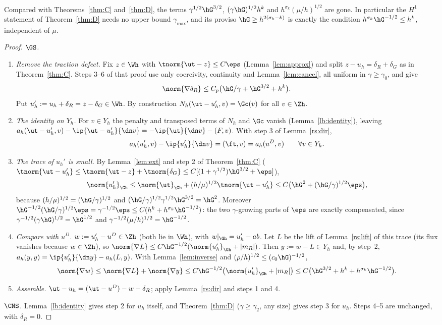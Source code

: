 Compared with Theorems~\ref{thm:C} and~\ref{thm:D}, the terms $\gamma^{1/2}\hG^{3/2}$, $(\gamma\hG)^{1/2}h^k$ and $h^{\sigma_k}(\mu/h)^{1/2}$ are gone. In particular the $H^1$ statement of Theorem~\ref{thm:D} needs no upper bound $\gamma_{\max}$, and its proviso $\hG\ge h^{2(\sigma_k-k)}$ is exactly the condition $h^{\sigma_k}\hG^{-1/2}\le h^k$, independent of $\mu$.

\begin{proof}
\emph{$\GS$.}
\begin{enumerate}
\item \emph{Remove the traction defect.} Fix $z\in\Wh$ with $\tnorm{\ut-z}\le C\eps$ (Lemma~\ref{lem:approx}) and split $z-u_h=\delta_R+\delta_G$ as in Theorem~\ref{thm:C}. Steps 3--6 of that proof use only coercivity, continuity and Lemma~\ref{lem:cancel}, all uniform in $\gamma\ge\gamma_0$, and give
\[
\norm{\nabla\delta_R}\le C_p\bigl(\hG/\gamma+\hG^{3/2}+h^k\bigr).
\]
Put $u_h':=u_h+\delta_R=z-\delta_G\in\Wh$. By construction $N_h(\ut-u_h',v)=\Gc(v)$ for all $v\in\Zh$.
\item \emph{The identity on $Y_h$.} For $v\in Y_h$ the penalty and transposed terms of $N_h$ and $\Gc$ vanish (Lemma~\ref{lb:identity}), leaving $a_h(\ut-u_h',v)-\ip{\ut-u_h'}{\dn v}=-\ip{\ut}{\dn v}-(F,v)$. With step 3 of Lemma~\ref{rs:dir},
\[
a_h(u_h',v)-\ip{u_h'}{\dn v}=(\ft,v)=a_h(u^D,v)\qquad\forall v\in Y_h .
\]
\item \emph{The trace of $u_h'$ is small.} By Lemma~\ref{lem:ext} and step 2 of Theorem~\ref{thm:C} ($\tnorm{\ut-u_h'}\le\tnorm{\ut-z}+\tnorm{\delta_G}\le C[(1+\gamma^{1/2})\hG^{3/2}+\eps]$),
\[
\norm{u_h'}_{\Gh}\le\norm{\ut}_{\Gh}+(h/\mu)^{1/2}\tnorm{\ut-u_h'}\le C\bigl(\hG^2+(\hG/\gamma)^{1/2}\eps\bigr),
\]
because $(h/\mu)^{1/2}=(\hG/\gamma)^{1/2}$ and $(\hG/\gamma)^{1/2}\gamma^{1/2}\hG^{3/2}=\hG^2$. Moreover $\hG^{-1/2}(\hG/\gamma)^{1/2}\eps=\gamma^{-1/2}\eps\le C(h^k+h^{\sigma_k}\hG^{-1/2})$: the two $\gamma$-growing parts of $\eps$ are exactly compensated, since $\gamma^{-1/2}(\gamma\hG)^{1/2}=\hG^{1/2}$ and $\gamma^{-1/2}(\mu/h)^{1/2}=\hG^{-1/2}$.
\item \emph{Compare with $u^D$.} $w:=u_h'-u^D\in\Zh$ (both lie in $\Wh$), with $w|_{\Gh}=u_h'-ab$. Let $L$ be the lift of Lemma~\ref{rs:lift} of this trace (its flux vanishes because $w\in\Zh$), so $\norm{\nabla L}\le C\hG^{-1/2}(\norm{u_h'}_{\Gh}+|m_R|)$. Then $y:=w-L\in Y_h$ and, by step~2, $a_h(y,y)=\ip{u_h'}{\dn y}-a_h(L,y)$. With Lemma~\ref{lem:inverse} and $(\rho/h)^{1/2}\le(c_0\hG)^{-1/2}$,
\[
\norm{\nabla w}\le\norm{\nabla L}+\norm{\nabla y}\le C\hG^{-1/2}\bigl(\norm{u_h'}_{\Gh}+|m_R|\bigr)\le C\bigl(\hG^{3/2}+h^k+h^{\sigma_k}\hG^{-1/2}\bigr).
\]
\item \emph{Assemble.} $\ut-u_h=(\ut-u^D)-w-\delta_R$; apply Lemma~\ref{rs:dir} and steps 1 and 4.
\end{enumerate}
\emph{$\CNS$.} Lemma~\ref{lb:identity} gives step 2 for $u_h$ itself, and Theorem~\ref{thm:D} ($\gamma\ge\gamma_2$, any size) gives step 3 for $u_h$. Steps 4--5 are unchanged, with $\delta_R=0$.
\end{proof}

